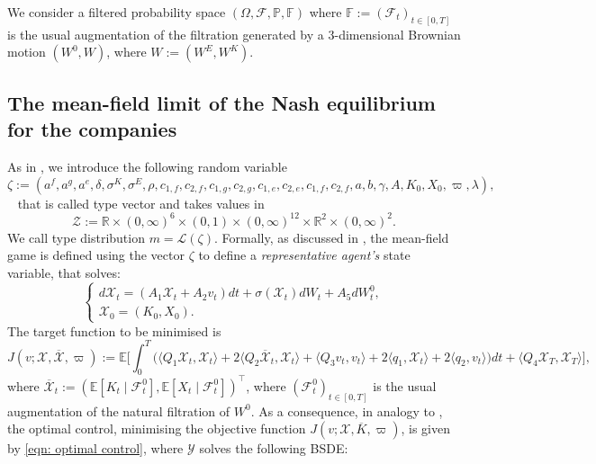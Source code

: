 \documentclass[11pt,twoside]{amsart}
\theoremstyle{definition}
\numberwithin{equation}{section}
\newcommand{\w}{\varpi}
\newcommand{\E}{\mathbb{E}}
\newcommand{\F}{\mathbb{F}}
\newcommand{\R}{\mathbb{R}}
\newcommand{\ItF}{\mathcal{F}}
\newcommand{\prob}{\mathbb{P}}
\renewcommand{\bar}{\overline}
\begin{document}
We consider a filtered probability space $(\Omega, \ItF,\prob,\F)$ where $\F:= (\ItF_t)_{t\in[0,T]}$ is the usual augmentation of the filtration generated by a $3$-dimensional Brownian motion $(W^0,W)$, where $W := (W^E,W^K)$.



\subsection{The mean-field limit of the Nash equilibrium for the companies}
\label{subsection: mf companies game}
As in \cite{lacker2019mean}, we introduce the following random variable 
\begin{equation*}
\zeta:= (a^f,a^g,a^e,\delta,\sigma^K,\sigma^E,\rho,c_{1,f},c_{2,f},c_{1,g},c_{2,g},c_{1,e},c_{2,e},c_{1,f},c_{2,f},a,b,\gamma,A,K_0, X_0,\w,\lambda),
\end{equation*} 
that is called type vector and takes values in 
\begin{equation*}
\mathcal{Z}:= \R\times (0,\infty)^6 \times(0,1) \times (0,\infty)^{12} \times \R^2 \times (0,\infty)^2.
\end{equation*}
We call type distribution $m = \mathcal{L}(\zeta)$. 
Formally, as discussed in \cite[Section 3]{lacker2019mean}, the mean-field game is defined using the vector $\zeta$ to define a \emph{representative agent's} state variable, that solves: 
\begin{equation}
\label{eqn: mf state variable}
\begin{cases}
d\mathcal{X}_t = ( A_1 \mathcal{X}_t + A_2v_t)dt + \sigma(\mathcal{X}_t)dW_t + A_5dW^0_t,\\
\mathcal{X}_0=( K_0,X_0).
\end{cases}
\end{equation}
The target function to be minimised is
\begin{equation}
\label{eqn: mf target function}
J(v; \mathcal{X}, \bar{\mathcal{X}}, \w) := \E\bigg[\int_0^T \bigg(\langle Q_1 \mathcal{X}_t ,\mathcal{X}_t\rangle+ 2\langle Q_2 \bar{\mathcal{X}}_t, \mathcal{X}_t\rangle + \langle Q_3 v_t, v_t\rangle + 2\langle q_1, \mathcal{X}_t\rangle + 2 \langle q_2,v_t\rangle \bigg)dt + \langle Q_4\mathcal{X}_T, \mathcal{X}_T\rangle\bigg],
\end{equation}
where $\bar{\mathcal{X}}_t := (\E[K_t \mid \mathcal{F}^0_t],\E[X_t\mid \mathcal{F}^0_t])^\top$, where $(\mathcal{F}^0_t)_{t\in[0,T]}$ is the usual augmentation of the natural filtration of $W^0$. As a consequence, in analogy to \cite[Section 4]{del2024mean}, the optimal control, minimising the objective function $J(v; \mathcal{X}, \bar{K}, \w)$, is given by \eqref{eqn: optimal control}, where $\mathcal{Y}$ solves the following BSDE: 
\end{document}
